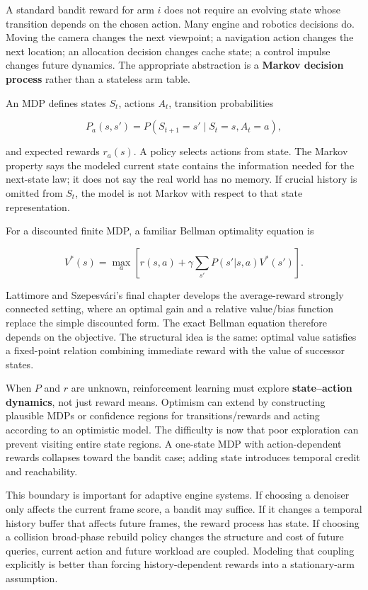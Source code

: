 \hypertarget{02-foundations-ii-ch029-a-bandit-becomes-a-sequential-control-problem-when-actions-change-what-is-observed-next}{}

A standard bandit reward for arm \(i\) does not require an evolving state whose transition depends on the chosen action. Many engine and robotics decisions do. Moving the camera changes the next viewpoint; a navigation action changes the next location; an allocation decision changes cache state; a control impulse changes future dynamics. The appropriate abstraction is a \textbf{Markov decision process} rather than a stateless arm table.

An MDP defines states \(S_t\), actions \(A_t\), transition probabilities

\[
P_a(s,s')
=
P(S_{t+1}=s'\mid S_t=s,A_t=a),
\]

and expected rewards \(r_a(s)\). A policy selects actions from state. The Markov property says the modeled current state contains the information needed for the next-state law; it does not say the real world has no memory. If crucial history is omitted from \(S_t\), the model is not Markov with respect to that state representation.

For a discounted finite MDP, a familiar Bellman optimality equation is

\[
V^*(s)
=
\max_a
\left[
r(s,a)
+
\gamma
\sum_{s'}
P(s'|s,a)V^*(s')
\right].
\]

Lattimore and Szepesvári's final chapter develops the average-reward strongly connected setting, where an optimal gain and a relative value/bias function replace the simple discounted form. The exact Bellman equation therefore depends on the objective. The structural idea is the same: optimal value satisfies a fixed-point relation combining immediate reward with the value of successor states.

When \(P\) and \(r\) are unknown, reinforcement learning must explore \textbf{state--action dynamics}, not just reward means. Optimism can extend by constructing plausible MDPs or confidence regions for transitions/rewards and acting according to an optimistic model. The difficulty is now that poor exploration can prevent visiting entire state regions. A one-state MDP with action-dependent rewards collapses toward the bandit case; adding state introduces temporal credit and reachability.

This boundary is important for adaptive engine systems. If choosing a denoiser only affects the current frame score, a bandit may suffice. If it changes a temporal history buffer that affects future frames, the reward process has state. If choosing a collision broad-phase rebuild policy changes the structure and cost of future queries, current action and future workload are coupled. Modeling that coupling explicitly is better than forcing history-dependent rewards into a stationary-arm assumption.

